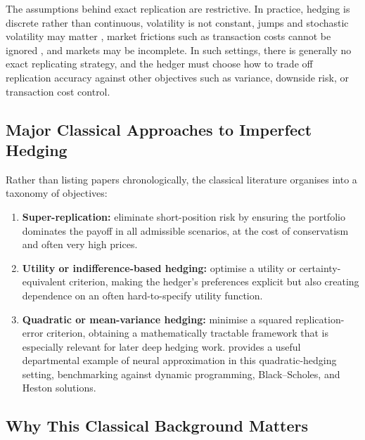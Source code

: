 \documentclass[12pt, a4paper]{article}
\begin{document}
The assumptions behind exact replication are restrictive. In practice, hedging is
discrete rather than continuous, volatility is not constant, jumps and stochastic
volatility may matter \citep{Heston1993}, market frictions such as transaction costs
cannot be ignored \citep{Leland1985}, and markets may be incomplete. In such settings,
there is generally no exact replicating strategy, and the hedger must choose how to
trade off replication accuracy against other objectives such as variance, downside
risk, or transaction cost control.


\subsection{Major Classical Approaches to Imperfect Hedging}
\label{subsec:classical_approaches}

Rather than listing papers chronologically, the classical literature organises into a
taxonomy of objectives:
\begin{enumerate}[label=\alph*.]
    \item \textbf{Super-replication:} eliminate short-position risk by ensuring the
          portfolio dominates the payoff in all admissible scenarios, at the cost of
          conservatism and often very high prices.
    \item \textbf{Utility or indifference-based hedging:} optimise a utility or
          certainty-equivalent criterion, making the hedger's preferences explicit but
          also creating dependence on an often hard-to-specify utility function.
    \item \textbf{Quadratic or mean-variance hedging:} minimise a squared
          replication-error criterion, obtaining a mathematically tractable framework
          that is especially relevant for later deep hedging work.
          \citet{Stangroom2021} provides a useful departmental example of neural
          approximation in this quadratic-hedging setting, benchmarking against
          dynamic programming, Black--Scholes, and Heston solutions.
\end{enumerate}


\subsection{Why This Classical Background Matters}
\label{subsec:classical_motivation}
\end{document}
